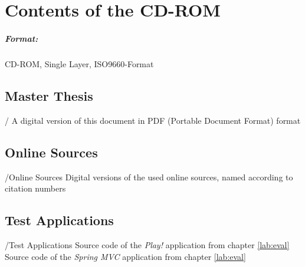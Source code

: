 \chapter{Contents of the CD-ROM}

\paragraph{Format:} 
		CD-ROM, Single Layer, ISO9660-Format

\section{Master Thesis}
\begin{FileList}{/}
 A digital version of this document in PDF (Portable Document Format) format
\end{FileList}


\section{Online Sources}

\begin{FileList}{/Online Sources}
 Digital versions of the used online sources, named according to citation numbers
\end{FileList}


\section{Test Applications}

\begin{FileList}{/Test Applications}
 Source code of the \textit{Play!} application from chapter \ref{lab:eval} %
 Source code of the \textit{Spring MVC} application from chapter \ref{lab:eval} %
\end{FileList}
